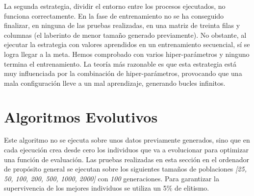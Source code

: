 La segunda estrategia, dividir el entorno entre los procesos ejecutados, no funciona correctamente. En la fase de entrenamiento no se ha conseguido finalizar, en ninguna de las pruebas realizadas, en una matriz de treinta filas y columnas (el laberinto de menor tamaño generado previamente). No obstante, al ejecutar la estrategia con valores aprendidos en un entrenamiento secuencial, sí se logra llegar a la meta. Hemos comprobado con varios hiper-parámetros y ninguno termina el entrenamiento. La teoría más razonable es que esta estrategia está muy influenciada por la combinación de hiper-parámetros, provocando que una mala configuración lleve a un mal aprendizaje, generando bucles infinitos.








\section{Algoritmos Evolutivos}

Este algoritmo no se ejecuta sobre unos datos previamente generados, sino que en cada ejecución crea desde cero los individuos que va a evolucionar para optimizar una función de evaluación. Las pruebas realizadas en esta sección en el ordenador de propósito general se ejecutan sobre los siguientes tamaños de poblaciones \textit{[25, 50, 100, 200, 500, 1000, 2000]} con \textit{100} generaciones. Para garantizar la supervivencia de los mejores individuos se utiliza un 5\% de elitismo. 

